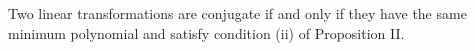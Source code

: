 Two linear transformations are conjugate if and only if they have the same minimum polynomial and satisfy condition (ii) of Proposition II.
